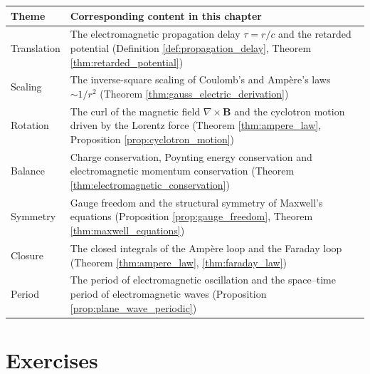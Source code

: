 \begin{center}
\begin{tabular}{>{\centering\arraybackslash}p{2.4cm}>{\centering\arraybackslash}p{9.3cm}}
\toprule
Theme & Corresponding content in this chapter \\
\midrule
Translation & The electromagnetic propagation delay $\tau=r/c$ and the retarded potential (Definition \ref{def:propagation_delay}, Theorem \ref{thm:retarded_potential}) \\
Scaling & The inverse-square scaling of Coulomb's and Amp\`ere's laws $\sim 1/r^2$ (Theorem \ref{thm:gauss_electric_derivation}) \\
Rotation & The curl of the magnetic field $\nabla\times\mathbf{B}$ and the cyclotron motion driven by the Lorentz force (Theorem \ref{thm:ampere_law}, Proposition \ref{prop:cyclotron_motion}) \\
Balance & Charge conservation, Poynting energy conservation and electromagnetic momentum conservation (Theorem \ref{thm:electromagnetic_conservation}) \\
Symmetry & Gauge freedom and the structural symmetry of Maxwell's equations (Proposition \ref{prop:gauge_freedom}, Theorem \ref{thm:maxwell_equations}) \\
Closure & The closed integrals of the Amp\`ere loop and the Faraday loop (Theorem \ref{thm:ampere_law}, \ref{thm:faraday_law}) \\
Period & The period of electromagnetic oscillation and the space--time period of electromagnetic waves (Proposition \ref{prop:plane_wave_periodic}) \\
\bottomrule
\end{tabular}
\end{center}

\section*{Exercises}

